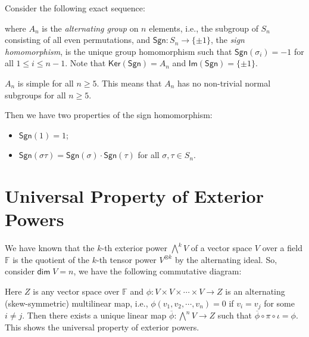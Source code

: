 \documentclass[
	11pt, %
	fleqn, %
	a4paper, %
]{LegrandOrangeBook}
\renewcommand{\ker}[1]{\mathsf{Ker}(#1)} %
\renewcommand{\Im}[1]{\mathsf{Im}(#1)} %
\renewcommand{\bar}[1]{\overline{#1}} %
\newcommand{\F}{\mathbb{F}} %
\renewcommand{\dim}{\mathsf{dim\;}} %
\newcommand{\sgn}{\mathsf{Sgn}} %
\begin{document}
Consider the following exact sequence:
\begin{center}
\end{center}
where $A_n$ is the \emph{alternating group} on $n$ elements, i.e., the subgroup of $S_n$ consisting of all even permutations, and $\sgn : S_n \to \{ \pm 1 \}$, the \emph{sign homomorphism}, is the unique group homomorphism such that $\sgn(\sigma_i) = -1$ for all $1 \leq i \leq n - 1$. Note that $\ker{\sgn} = A_n$ and $\Im{\sgn} = \{ \pm 1 \}$. 
\begin{remark}
    $A_n$ is simple for all $n \geq 5$. This means that $A_n$ has no non-trivial normal subgroups for all $n \geq 5$.
\end{remark}

Then we have two properties of the sign homomorphism:
\begin{itemize}
    \item $\sgn(1) = 1$;
    \item $\sgn(\sigma \tau) = \sgn(\sigma) \cdot \sgn(\tau)$ for all $\sigma, \tau \in S_n$.
\end{itemize}

\newpage

\section{Universal Property of Exterior Powers}

We have known that the $k$-th exterior power ${\bigwedge}^k V$ of a vector space $V$ over a field $\F$ is the quotient of the $k$-th tensor power $V^{\otimes k}$ by the alternating ideal. So, consider $\dim{V} = n$, we have the following commutative diagram:
\begin{center}
\end{center}
Here $Z$ is any vector space over $\F$ and $\phi : V \times V \times \cdots \times V \to Z$ is an alternating (skew-symmetric) multilinear map, i.e., $\phi(v_1, v_2, \cdots, v_n) = 0$ if $v_i = v_j$ for some $i \neq j$. Then there exists a unique linear map $\bar{\phi} : {\bigwedge}^n V \to Z$ such that $\bar{\phi} \circ \pi \circ \iota = \phi$. This shows the universal property of exterior powers.
\end{document}
